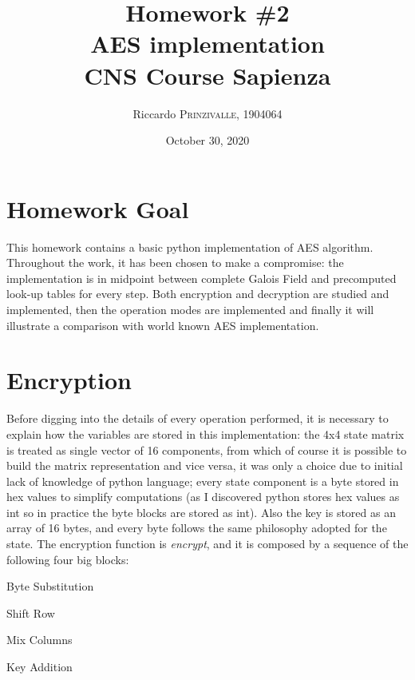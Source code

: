 \documentclass{article}
\title{Homework \#2 \\AES implementation \\[0.2em]\small{}CNS Course Sapienza} %
\author{Riccardo \textsc{Prinzivalle}, 1904064} %
\date{October 30, 2020} %
\begin{document}
\maketitle %


\section{Homework Goal}

This homework contains a basic python implementation of AES algorithm. Throughout the work, it has been chosen to make a compromise: the implementation is in midpoint between complete Galois Field and precomputed look-up tables for every step. Both encryption and decryption are studied and implemented, then the operation modes are implemented and finally it will illustrate a comparison with world known AES implementation.

\section{Encryption}
Before digging into the details of every operation performed, it is necessary to explain how the variables are stored in this implementation: the 4x4 state matrix is treated as single vector of 16 components, from which of course it is possible to build the matrix representation and vice versa, it was only a choice due to initial lack of knowledge of python language; every state component is a byte stored in hex values to simplify computations (as I discovered python stores hex values as int so in practice the byte blocks are stored as int). Also the key is stored as an array of 16 bytes, and every byte follows the same philosophy adopted for the state. \newline
The encryption function is \textit{encrypt}, and it is composed by a sequence of the following four big blocks:  

\begin{enumerate}
\begin{item}
Byte Substitution
\end{item}
\begin{item}
Shift Row 
\end{item}
\begin{item}
Mix Columns
\end{item}
\begin{item}
Key Addition 
\end{item}
\end{enumerate}
\end{document}

